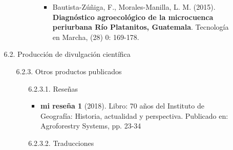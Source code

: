 \documentclass[12pt]{report}
\begin{document}
\begin{enumerate}
\begin{enumerate}
\begin{enumerate}
\begin{enumerate}
\begin{itemize}
\begin{itemize}
                                                                        \item{ Bautista-Zúñiga, F., Morales-Manilla, L. M. (2015).\textbf{ Diagnóstico agroecológico de la microcuenca periurbana Río Platanitos, Guatemala}. Tecnología en Marcha, (28) 0: 169-178.  }

                                                                \end{itemize}

                                                    \end{itemize}

                                        \end{enumerate}











                            \end{enumerate}



                        \item[6.2.] Producción de divulgación científica
                            \begin{enumerate}





                                    \item[6.2.3.] Otros productos publicados
                                            \begin{itemize}

                                                    \item[6.2.3.1.] Reseñas
                                                        \begin{itemize}

                                                                \item{\textbf{ mi reseña 1} (2018). Libro: 70 años del Instituto de Geografía: Historia, actualidad y perspectiva. Publicado en: Agroforestry Systems, pp. 23-34 }

                                                        \end{itemize}



                                                    \item[6.2.3.2.] Traducciones
                                                        \begin{itemize}


\end{itemize}
\end{itemize}
\end{enumerate}
\end{enumerate}
\end{enumerate}
\end{document}
